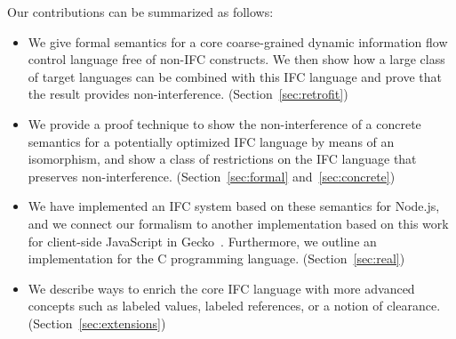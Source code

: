 Our contributions can be summarized as follows:
\begin{itemize}
  \item We give formal semantics for a core coarse-grained
  dynamic information flow control language free of non-IFC constructs.
  We then show how a large class of target languages can be combined
  with this IFC language and prove that the result provides
  non-interference. (Section~\ref{sec:retrofit})
  \item We provide a proof technique to show the non-interference
  of a concrete semantics for a potentially optimized IFC language
  by means of an isomorphism, and show a class of restrictions on
  the IFC language that preserves non-interference. (Section~\ref{sec:formal}
  and~\ref{sec:concrete})
  \item We have implemented an IFC system based on these semantics
  for Node.js, and we connect our formalism to another implementation
  based on this work
  for client-side JavaScript in Gecko~\cite{swapi}.
  Furthermore, we outline an implementation for the C programming
  language.
  (Section~\ref{sec:real})
  \item We describe ways to enrich the core IFC language with
  more advanced concepts such as labeled values, labeled references, or a
  notion of clearance. (Section~\ref{sec:extensions})
\end{itemize}

